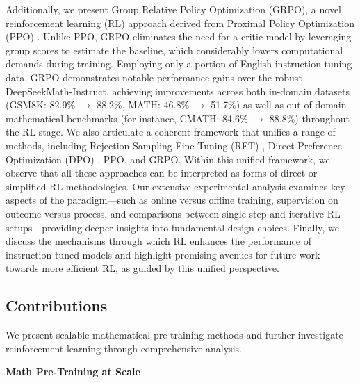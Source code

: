 Additionally, we present Group Relative Policy Optimization (GRPO), a novel reinforcement learning (RL) approach derived from Proximal Policy Optimization (PPO) \citep{schulman2017proximal}. Unlike PPO, GRPO eliminates the need for a critic model by leveraging group scores to estimate the baseline, which considerably lowers computational demands during training. Employing only a portion of English instruction tuning data, GRPO demonstrates notable performance gains over the robust DeepSeekMath-Instruct, achieving improvements across both in-domain datasets (GSM8K: 82.9\% $\rightarrow$ 88.2\%, MATH: 46.8\% $\rightarrow$ 51.7\%) as well as out-of-domain mathematical benchmarks (for instance, CMATH: 84.6\% $\rightarrow$ 88.8\%) throughout the RL stage. We also articulate a coherent framework that unifies a range of methods, including Rejection Sampling Fine-Tuning (RFT) \citep{yuan2023scaling}, Direct Preference Optimization (DPO) \citep{dpo}, PPO, and GRPO. Within this unified framework, we observe that all these approaches can be interpreted as forms of direct or simplified RL methodologies. Our extensive experimental analysis examines key aspects of the paradigm—such as online versus offline training, supervision on outcome versus process, and comparisons between single-step and iterative RL setups—providing deeper insights into fundamental design choices. Finally, we discuss the mechanisms through which RL enhances the performance of instruction-tuned models and highlight promising avenues for future work towards more efficient RL, as guided by this unified perspective.

\subsection{Contributions}
We present scalable mathematical pre-training methods and further investigate reinforcement learning through comprehensive analysis.

\textbf{Math Pre-Training at Scale}

